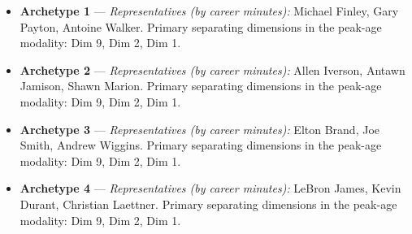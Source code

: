 \begin{itemize}
\item \textbf{Archetype 1} --- \emph{Representatives (by career minutes):} Michael Finley, Gary Payton, Antoine Walker. Primary separating dimensions in the peak-age modality: Dim 9, Dim 2, Dim 1.
\item \textbf{Archetype 2} --- \emph{Representatives (by career minutes):} Allen Iverson, Antawn Jamison, Shawn Marion. Primary separating dimensions in the peak-age modality: Dim 9, Dim 2, Dim 1.
\item \textbf{Archetype 3} --- \emph{Representatives (by career minutes):} Elton Brand, Joe Smith, Andrew Wiggins. Primary separating dimensions in the peak-age modality: Dim 9, Dim 2, Dim 1.
\item \textbf{Archetype 4} --- \emph{Representatives (by career minutes):} LeBron James, Kevin Durant, Christian Laettner. Primary separating dimensions in the peak-age modality: Dim 9, Dim 2, Dim 1.
\end{itemize}
